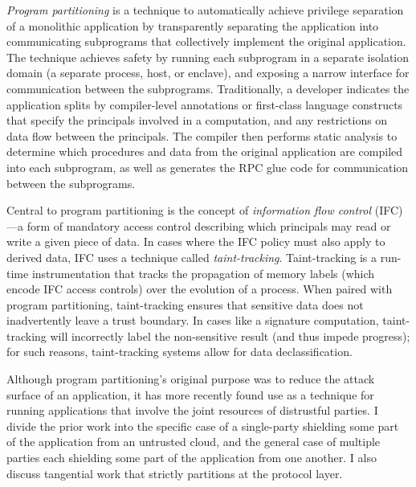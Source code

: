 \emph{Program partitioning} is a technique to automatically achieve privilege
separation of a monolithic application by transparently separating the
application into communicating subprograms that collectively implement the
original application.
%
The technique achieves safety by running each subprogram in a separate
isolation domain (a separate process, host, or enclave), and exposing a narrow
interface for communication between the subprograms.
%
Traditionally, a developer indicates the application splits by 
compiler-level annotations or first-class language constructs that specify the
principals involved in a computation, and any restrictions on data flow between
the principals.
%
The compiler then performs static analysis to determine which procedures and
data from the original application are compiled into each subprogram, as well as
generates the RPC glue code for communication between the subprograms.


Central to program partitioning is the concept of \emph{information flow
control} (IFC)---a form of mandatory access control describing which
principals may read or write a given piece of data.
%
In cases where the IFC policy must also apply to derived data, IFC uses a
technique called \emph{taint-tracking}.
%
Taint-tracking is a run-time instrumentation that tracks the
propagation of memory labels (which encode IFC access controls) over the
evolution of a process. 
%
When paired with program partitioning, taint-tracking ensures that sensitive
data does not inadvertently leave a trust boundary.
%
In cases like a signature computation, taint-tracking will incorrectly label
the non-sensitive result (and thus impede progress); for such reasons,
taint-tracking systems allow for data declassification.


Although program partitioning's original purpose was to reduce the attack
surface of an application, it has more recently found use as a technique for
running applications that involve the joint resources of distrustful parties.
%
I divide the prior work into the specific case of a single-party shielding
some part of the application from an untrusted cloud, and the general case of
multiple parties each shielding some part of the application from one another.
%
I also discuss tangential work that strictly partitions at the protocol layer.


